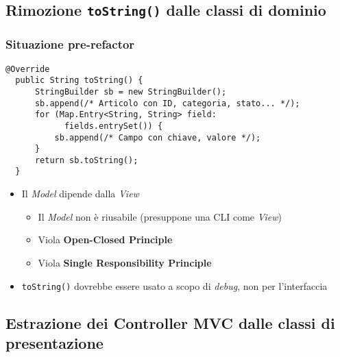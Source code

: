 
\subsection{Rimozione \texttt{toString()} dalle classi di dominio}
\begin{frame}[fragile]
  \frametitle{Situazione pre-refactor}
  \begin{lstlisting}[autogobble, title={\texttt{toString()} di \texttt{Article.java}}]
  @Override
  public String toString() {
      StringBuilder sb = new StringBuilder();
      sb.append(/* Articolo con ID, categoria, stato... */);
      for (Map.Entry<String, String> field:
            fields.entrySet()) {
          sb.append(/* Campo con chiave, valore */);
      }
      return sb.toString();
  }
  \end{lstlisting}

  \begin{itemize}
    \item Il \emph{Model} dipende dalla \emph{View}
    \begin{itemize}
      \item Il \emph{Model} non è riusabile (presuppone una CLI come \emph{View})
      \item Viola \textbf{Open-Closed Principle}
      \item Viola \textbf{Single Responsibility Principle}
    \end{itemize}
    \item \texttt{toString()} dovrebbe essere usato a scopo di \emph{debug}, non per l'interfaccia
  \end{itemize}
\end{frame}

\subsection{Estrazione dei Controller MVC dalle classi di presentazione}
